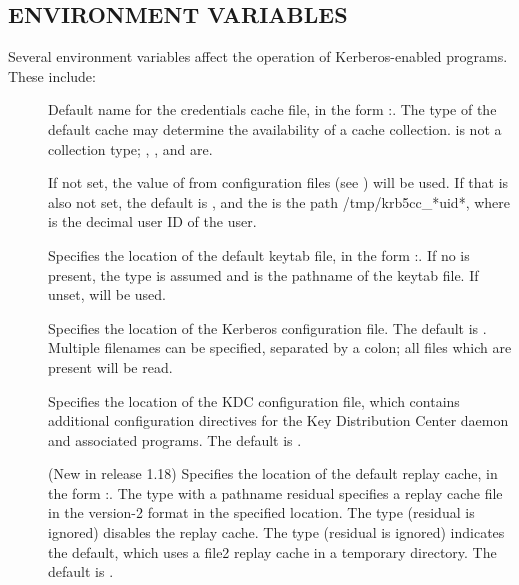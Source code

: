 \documentclass[letterpaper,10pt,english]{sphinxmanual}
\begin{document}
\subsection{ENVIRONMENT VARIABLES}
\label{\detokenize{user/user_config/kerberos:environment-variables}}
Several environment variables affect the operation of Kerberos-enabled
programs.  These include:
\begin{description}
\item[{}] \leavevmode
Default name for the credentials cache file, in the form
:.  The type of the default cache may determine
the availability of a cache collection.   is not a
collection type; , , and  are.

If not set, the value of  from
configuration files (see ) will be used.  If that
is also not set, the default  is , and the
 is the path /tmp/krb5cc\_*uid*, where  is the
decimal user ID of the user.

\item[{}] \leavevmode
Specifies the location of the default keytab file, in the form
:.  If no  is present, the  type is
assumed and  is the pathname of the keytab file.  If
unset,  will be used.

\item[{}] \leavevmode
Specifies the location of the Kerberos configuration file.  The
default is .  Multiple filenames can
be specified, separated by a colon; all files which are present
will be read.

\item[{}] \leavevmode
Specifies the location of the KDC configuration file, which
contains additional configuration directives for the Key
Distribution Center daemon and associated programs.  The default
is .

\item[{}] \leavevmode
(New in release 1.18) Specifies the location of the default replay
cache, in the form :.  The  type with a
pathname residual specifies a replay cache file in the version-2
format in the specified location.  The  type (residual is
ignored) disables the replay cache.  The  type (residual is
ignored) indicates the default, which uses a file2 replay cache in
a temporary directory.  The default is .


\end{description}
\end{document}
